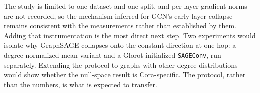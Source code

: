 \documentclass[
  conference]{IEEEtran}
\begin{document}
The study is limited to one dataset and one split, and per-layer
gradient norms are not recorded, so the mechanism inferred for GCN's
early-layer collapse remains consistent with the measurements rather
than established by them. Adding that instrumentation is the most direct
next step. Two experiments would isolate why GraphSAGE collapses onto
the constant direction at one hop: a degree-normalized-mean variant and
a Glorot-initialized \citep{glorot2010understanding} \texttt{SAGEConv},
run separately. Extending the protocol to graphs with other degree
distributions would show whether the null-space result is Cora-specific.
The protocol, rather than the numbers, is what is expected to transfer.



\end{document}
